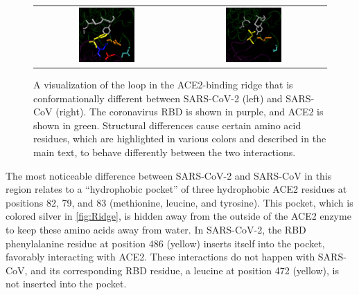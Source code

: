 \begin{figure}[h]
	\centering
	\mySfFamily
	\begin{tabular}{c c}
	\includegraphics[width = 0.4\textwidth]{../images/Ridge_SARS-2.png} & \includegraphics[width = 0.4\textwidth]{../images/Ridge_SARS.png}
	\end{tabular}
	\caption{A visualization of the loop in the ACE2-binding ridge that is conformationally different between SARS-CoV-2 (left) and SARS-CoV (right). The coronavirus RBD is shown in purple, and ACE2 is shown in green. Structural differences cause certain amino acid residues, which are highlighted in various colors and described in the main text, to behave differently between the two interactions.}
	\label{fig:Ridge}
\end{figure}

The most noticeable difference between SARS-CoV-2 and SARS-CoV in this region relates to a ``hydrophobic pocket'' of three hydrophobic ACE2 residues at positions 82, 79, and 83 (methionine, leucine, and tyrosine). This pocket, which is colored silver in \autoref{fig:Ridge}, is hidden away from the outside of the ACE2 enzyme to keep these amino acids away from water. In SARS-CoV-2, the RBD phenylalanine residue at position 486 (yellow) inserts itself into the pocket, favorably interacting with ACE2. These interactions do not happen with SARS-CoV, and its corresponding RBD residue, a leucine at position 472 (yellow), is not inserted into the pocket.

